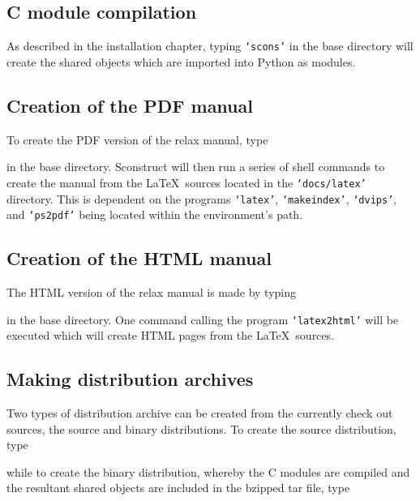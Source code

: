 \subsection{C module compilation}

As described in the installation chapter, typing \texttt{`scons'} in the base directory will create the shared objects which are imported into Python as modules.


\subsection{Creation of the PDF manual}

To create the PDF version of the relax manual, type


in the base directory.  Sconstruct will then run a series of shell commands to create the manual from the \LaTeX\ sources located in the \texttt{`docs/latex'} directory.  This is dependent on the programs \texttt{`latex'}, \texttt{`makeindex'}, \texttt{`dvips'}, and \texttt{`ps2pdf'} being located within the environment's path.


\subsection{Creation of the HTML manual}

The HTML version of the relax manual is made by typing


in the base directory.  One command calling the program \texttt{`latex2html'} will be executed which will create HTML pages from the \LaTeX\ sources.


\subsection{Making distribution archives}

Two types of distribution archive can be created from the currently check out sources, the source and binary distributions.  To create the source distribution, type 


while to create the binary distribution, whereby the C modules are compiled and the resultant shared objects are included in the bzipped tar file, type

